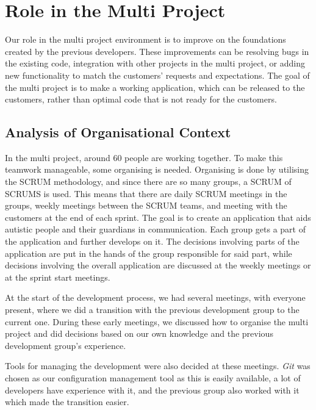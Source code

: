 \chapter{Role in the Multi Project}
Our role in the multi project environment is to improve on the foundations created by the previous developers.
These improvements can be resolving bugs in the existing code, integration with other projects in the multi project, or adding new functionality to match the customers' requests and expectations.
The goal of the multi project is to make a working application, which can be released to the customers, rather than optimal code that is not ready for the customers.

\section{Analysis of Organisational Context}
In the multi project, around 60 people are working together. 
To make this teamwork manageable, some organising is needed.
Organising is done by utilising the SCRUM methodology, and since there are so many groups, a SCRUM of SCRUMS is used.
This means that there are daily SCRUM meetings in the groups, weekly meetings between the SCRUM teams, and meeting with the customers at the end of each sprint.
The goal is to create an application that aids autistic people and their guardians in communication.
Each group gets a part of the application and further develops on it. 
The decisions involving parts of the application are put in the hands of the group responsible for said part, while decisions involving the overall application are discussed at the weekly meetings or at the sprint start meetings.

At the start of the development process, we had several meetings, with everyone present, where we did a transition with the previous development group to the current one.
During these early meetings, we discussed how to organise the multi project and did decisions based on our own knowledge and the previous development group's experience.

Tools for managing the development were also decided at these meetings.
\textit{Git} \citep{misc:git} was chosen as our configuration management tool as this is easily available, a lot of developers have experience with it, and the previous group also worked with it which made the transition easier.

